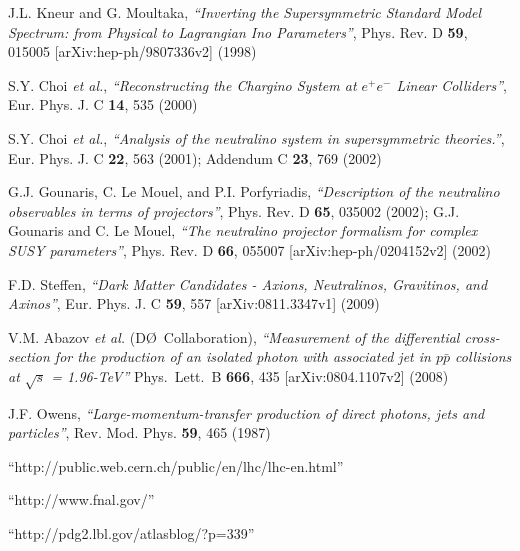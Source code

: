 \begin{thebibliography}{1}

 J.L. Kneur and G. Moultaka, \textit{``Inverting the Supersymmetric Standard Model Spectrum: from Physical to Lagrangian Ino Parameters''}, Phys. Rev. D \textbf{59}, 015005 [arXiv:hep-ph/9807336v2] (1998)

 S.Y. Choi \textit{et al.}, \textit{``Reconstructing the Chargino System at $e^{+}e^{-}$ Linear Colliders''}, Eur. Phys. J. C \textbf{14}, 535 (2000)

 S.Y. Choi \textit{et al.}, \textit{``Analysis of the neutralino system in supersymmetric theories.''}, Eur. Phys. J. C \textbf{22}, 563 (2001); Addendum C  \textbf{23}, 769 (2002)

 G.J. Gounaris, C. Le Mouel, and P.I. Porfyriadis, \textit{``Description of the neutralino observables in terms of projectors''}, Phys. Rev. D \textbf{65}, 035002 (2002); G.J. Gounaris and C. Le Mouel, \textit{``The neutralino projector formalism for complex SUSY parameters''}, Phys. Rev. D \textbf{66}, 055007 [arXiv:hep-ph/0204152v2] (2002)


 F.D. Steffen, \textit{``Dark Matter Candidates - Axions, Neutralinos, Gravitinos, and Axinos''}, Eur. Phys. J. C \textbf{59}, 557 [arXiv:0811.3347v1] (2009)

 {V.M. Abazov {\it et al.} (D\O~Collaboration), \textit{``Measurement of the differential cross-section for the production of an isolated photon with associated jet in $p \bar{p}$ collisions at $\sqrt{s}$ = 1.96-TeV''} Phys.\ Lett.\ B {\bf 666}, 435 [arXiv:0804.1107v2] (2008)}

 J.F. Owens, \textit{``Large-momentum-transfer production of direct photons, jets and particles''}, Rev. Mod. Phys. \textbf{59}, 465 (1987)

``http://public.web.cern.ch/public/en/lhc/lhc-en.html''

``http://www.fnal.gov/''

``http://pdg2.lbl.gov/atlasblog/?p=339''


\end{thebibliography}
